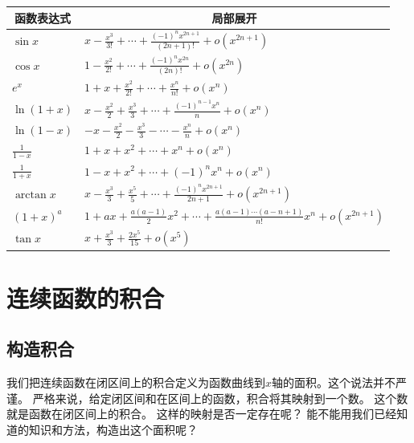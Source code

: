 \documentclass[12pt,UTF8]{ctexbook}
\newcommand{\olim}[1]{\mathit{o}\left(#1\right)}  %
\theoremstyle{definition}
\theoremstyle{plain}
\begin{document}
\begin{appendix}
\begin{center}
    \renewcommand{\arraystretch}{2}
    \setlength{\extrarowheight}{-3pt}
    \begin{longtable}{|l|l|}
        \hline \multicolumn{1}{|c|}{\textbf{函数表达式}} & \multicolumn{1}{c|}{\textbf{局部展开}} \\[4pt] 
        \hline    
        $\sin{x}$ & $x - \frac{x^3}{3!} + \cdots + \frac{(-1)^n x^{2n+1}}{(2n+1)!} + \olim{x^{2n+1}} $ \\[4pt]
        \hline
        $\cos{x}$ & $1 - \frac{x^2}{2!} + \cdots + \frac{(-1)^n x^{2n}}{(2n)!} + \olim{x^{2n}} $ \\[4pt]
        \hline
        $e^x$ & $1 + x + \frac{x^2}{2!} + \cdots + \frac{x^n}{n!} + \olim{x^n}$ \\[4pt]
        \hline
        $\ln{(1 + x)}$ & $x - \frac{x^2}{2} + \frac{x^3}{3} + \cdots + \frac{(-1)^{n-1}x^{n}}{n} + \olim{x^{n}}$ \\[4pt]  
        \hline
        $\ln{(1 - x)}$ & $- x - \frac{x^2}{2} - \frac{x^3}{3} - \cdots - \frac{x^{n}}{n} + \olim{x^{n}}$ \\[4pt]  
        \hline
        $\frac{1}{1 - x}$ & $1 + x + x^2 + \cdots + x^n + \olim{x^{n}}$ \\[4pt]  
        \hline
        $\frac{1}{1 + x}$ & $1 - x + x^2 + \cdots + (-1)^n x^n + \olim{x^{n}}$ \\[4pt]  
        \hline
        $\arctan{x}$ & $x - \frac{x^3}{3} + \frac{x^5}{5} + \cdots + \frac{(-1)^n x^{2n+1}}{2n+1} + \olim{x^{2n+1}}$ \\[4pt]  
        \hline
        $(1 + x)^a$ & $1 + ax + \frac{a(a - 1)}{2}x^2 + \cdots + \frac{a(a - 1)\cdots(a - n + 1)}{n!}x^n + \olim{x^{2n+1}}$ \\[4pt] 
        \hline
        $\tan{x}$ & $x + \frac{x^3}{3} + \frac{2x^5}{15} + \olim{x^{5}}$ \\[4pt]
        \hline
    \end{longtable}
\end{center}

\chapter{连续函数的积合}

\section{构造积合}

我们把连续函数在闭区间上的积合定义为函数曲线到$x$轴的面积。这个说法并不严谨。
严格来说，给定闭区间和在区间上的函数，积合将其映射到一个数。
这个数就是函数在闭区间上的积合。
这样的映射是否一定存在呢？
能不能用我们已经知道的知识和方法，构造出这个面积呢？


\end{appendix}
\end{document}
